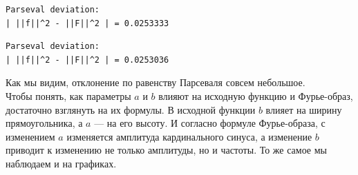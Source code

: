 \documentclass[a4paper]{article}
\begin{document}
\begin{minipage}{0.33\textwidth}
\begin{lstlisting}[caption={$a = 2$, $b = 1$}, numbers=none]
Parseval deviation:
| ||f||^2 - ||F||^2 | = 0.0253333
\end{lstlisting}
\end{minipage}\hfill
\begin{minipage}{0.33\textwidth}
\begin{lstlisting}[caption={$a = 2$, $b = 2$}, numbers=none]
Parseval deviation:
| ||f||^2 - ||F||^2 | = 0.0253036
\end{lstlisting}
\end{minipage}
Как мы видим, отклонение по равенству Парсеваля совсем небольшое.\\[0.5em]
Чтобы понять, как параметры $a$ и $b$ влияют на исходную функцию и Фурье-образ, достаточно взглянуть на их формулы. В исходной функции $b$ влияет на ширину прямоугольника, а $a$ --- на его высоту. И согласно формуле Фурье-образа, с изменением $a$ изменяется амплитуда кардинального синуса, а изменение $b$ приводит к изменению не только амплитуды, но и частоты. То же самое мы наблюдаем и на графиках.
\end{document}
